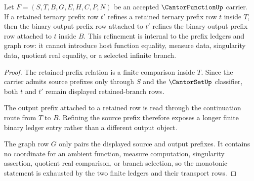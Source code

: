 \begin{theorem}
\label{thm:cantor-function-prefix-monotonicity}
Let $F=(S,T,B,G,E,H,C,P,N)$ be an accepted $\CantorFunctionUp$ carrier. If a retained ternary prefix row $t'$ refines a retained ternary prefix row $t$ inside $T$, then the binary output prefix row attached to $t'$ refines the binary output prefix row attached to $t$ inside $B$. This refinement is internal to the prefix ledgers and graph row: it cannot introduce host function equality, measure data, singularity data, quotient real equality, or a selected infinite branch.
\end{theorem}
\begin{proof}
The retained-prefix relation is a finite comparison inside $T$. Since the carrier admits source prefixes only through $S$ and the $\CantorSetUp$ classifier, both $t$ and $t'$ remain displayed retained-branch rows.

The output prefix attached to a retained row is read through the continuation route from $T$ to $B$. Refining the source prefix therefore exposes a longer finite binary ledger entry rather than a different output object.

The graph row $G$ only pairs the displayed source and output prefixes. It contains no coordinate for an ambient function, measure computation, singularity assertion, quotient real comparison, or branch selection, so the monotonic statement is exhausted by the two finite ledgers and their transport rows.
\end{proof}

